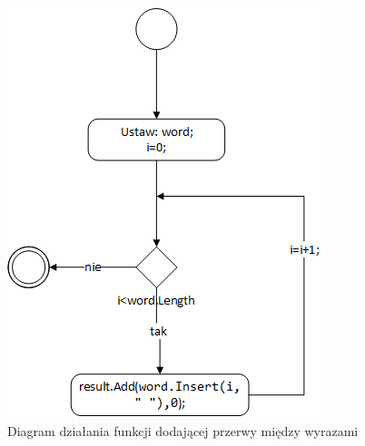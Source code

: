 \begin{figure} [H]
	\centering
	\includegraphics[width=0.6\linewidth]{rozdzial02/SpaceSearcher.png}
	\caption{Diagram działania funkcji dodającej przerwy między wyrazami}
	\label{fig:SpaceAdder}
\end{figure}



